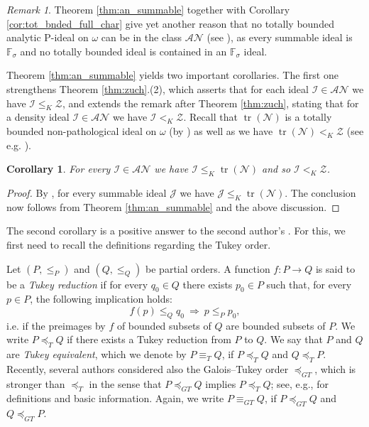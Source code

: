 \documentclass[a4paper,11pt,fleqn]{amsart}
\newtheorem{corollary}[theorem]{Corollary}
\theoremstyle{definition}
\theoremstyle{remark}
\newtheorem{remark}[theorem]{Remark}
\numberwithin{equation}{section}
\newcommand{\F}{\mathbb{F}}
\newcommand{\aA}{\mathcal{A}}
\newcommand{\iI}{\mathcal{I}}
\newcommand{\jJ}{\mathcal{J}}
\newcommand{\nN}{\mathcal{N}}
\newcommand{\zZ}{\mathcal{Z}}
\DeclareMathOperator{\tr}{tr}
\begin{document}
\begin{remark}
Theorem \ref{thm:an_summable} together with Corollary \ref{cor:tot_bnded_full_char} give yet another reason that no totally bounded analytic P-ideal on $\omega$ can be in the class $\aA\nN$ (see \cite[Corollary 4.6]{Zuc25}), as every summable ideal is $\F_\sigma$ and no totally bounded ideal is contained in an $\F_\sigma$ ideal.
\end{remark}

Theorem \ref{thm:an_summable} yields two important corollaries. The first one strengthens Theorem \ref{thm:zuch}.(2), which asserts that for each ideal $\iI\in\aA\nN$ we have $\iI\le_K\zZ$, and extends the remark after Theorem \ref{thm:zuch}, stating that for a density ideal $\iI\in\aA\nN$ we have $\iI<_K\zZ$. Recall that $\tr(\nN)$ is a totally bounded non-pathological ideal on $\omega$ (by \cite[Proposition 3.18]{HHH07}) as well as we have $\tr(\nN)<_K\zZ$ (see e.g. \cite[page 728]{Zuc25}).

\begin{corollary}\label{cor:tr}
For every $\iI\in\aA\nN$ we have $\iI\leq_K\tr(\nN)$ and so $\iI<_K\zZ$.
\end{corollary}
\begin{proof}
By \cite[Proposition 3.5]{HHH07}, for every summable ideal $\jJ$ we have $\jJ\le_K\tr(\nN)$. The conclusion now follows from Theorem \ref{thm:an_summable} and the above discussion.
\end{proof}

The second corollary is a positive answer to the second author's \cite[Question 9.4]{Zuc25}. For this, we first need to recall the definitions regarding the Tukey order. 

Let $(P, \leq_P)$ and $(Q, \leq_Q)$ be partial orders. A function $f\colon P\to Q$ is said to be a \textit{Tukey reduction} if for every $q_0\in Q$ there exists $p_0\in P$ such that, for every $p\in P$, the following implication holds:
\[f(p)\leq_Q q_0 \: \Longrightarrow \: p \leq_P p_0, \]
i.e. if the preimages by $f$ of bounded subsets of $Q$ are bounded subsets of $P$. We write $P\preceq_T Q$ if there exists a Tukey reduction from $P$ to $Q$. We say that $P$ and $Q$ are \textit{Tukey equivalent}, which we denote by $P\equiv_T Q$, if $P\preceq_T Q$ and $Q\preceq_T P$. Recently, several authors considered also the Galois--Tukey order $\preceq_{GT}$, which is stronger than $\preceq_T$ in the sense that $P\preceq_{GT} Q$ implies $P\preceq_T Q$; see, e.g., \cite{HLZ} for definitions and basic information. Again, we write $P\equiv_{GT} Q$, if $P\preceq_{GT} Q$ and $Q\preceq_{GT} P$. %
\end{document}
